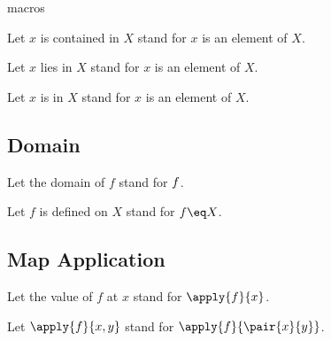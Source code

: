 \documentclass{article}
\begin{document}
\begin{smodule}{macros}
\begin{forthel}
  Let $x$ is contained in $X$ stand for $x$ is an element of $X$.

  Let $x$ lies in $X$ stand for $x$ is an element of $X$.

  Let $x$ is in $X$ stand for $x$ is an element of $X$.
\end{forthel}

\subsection{Domain}

\begin{forthel}
  Let the domain of $f$ stand for $\relax{f}$.

  Let $f$ is defined on $X$ stand for $\dom{f}\eq X$.
\end{forthel}

\subsection{Map Application}

\begin{forthel}
  Let the value of $f$ at $x$ stand for $\apply{f}{x}$.

  Let $\apply{f}{x,y}$ stand for $\apply{f}{\pair{x}{y}}$.
\end{forthel}
\end{smodule}
\end{document}
